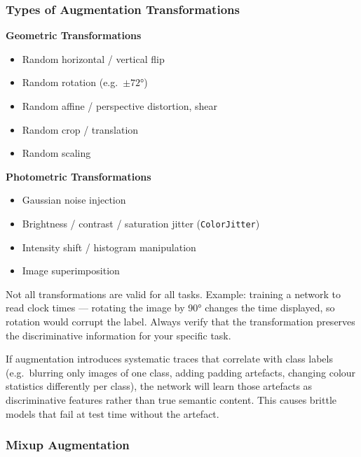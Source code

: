 \documentclass[11pt,a4paper]{article}
\begin{document}
\subsubsection{Types of Augmentation Transformations}

\begin{tcolorbox}[colback=LightBlue,colframe=AccentBlue,boxrule=0.8pt,arc=3pt]
\textbf{Geometric Transformations}
\begin{itemize}
  \item Random horizontal / vertical flip
  \item Random rotation (e.g.\ $\pm72°$)
  \item Random affine / perspective distortion, shear
  \item Random crop / translation
  \item Random scaling
\end{itemize}
\textbf{Photometric Transformations}
\begin{itemize}
  \item Gaussian noise injection
  \item Brightness / contrast / saturation jitter (\texttt{ColorJitter})
  \item Intensity shift / histogram manipulation
  \item Image superimposition
\end{itemize}
\end{tcolorbox}

\begin{warnbox}
Not all transformations are valid for all tasks. Example: training a network to read clock times — rotating the image by 90° changes the time displayed, so rotation would corrupt the label. Always verify that the transformation preserves the discriminative information for your specific task.
\end{warnbox}

\begin{warnbox}
If augmentation introduces systematic traces that correlate with class labels (e.g.\ blurring only images of one class, adding padding artefacts, changing colour statistics differently per class), the network will learn those artefacts as discriminative features rather than true semantic content. This causes brittle models that fail at test time without the artefact.
\end{warnbox}

\subsubsection{Mixup Augmentation}
\end{document}

